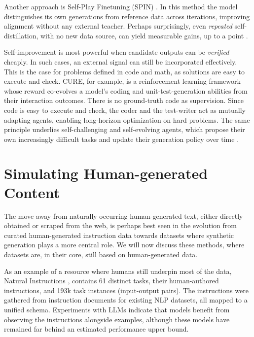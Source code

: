 Another approach is Self-Play Finetuning (SPIN) \citep{chen2024self}. In this method  the model distinguishes its own generations from reference data across iterations, improving alignment without any external teacher. Perhaps surprisingly, even \emph{repeated} self-distillation, with no new data source, can yield measurable gains, up to a point \citep{pareek2024understandinggainsrepeatedselfdistillation}.

Self-improvement is most powerful when candidate outputs can be \emph{verified} cheaply. In such cases, an external signal can still be incorporated effectively. This is the case for problems defined in code and math, as solutions are easy to execute and check. CURE, for example, is a reinforcement learning framework whose reward co-evolves a model's coding and unit-test-generation abilities from their interaction outcomes. There is no ground-truth code as supervision. Since code is easy to execute and check, the coder and the test-writer act as mutually adapting agents, enabling long-horizon optimization on hard problems. The same principle underlies self-challenging and self-evolving agents, which propose their own increasingly difficult tasks and update their generation policy over time \citep{NEURIPS2025_a5a305fa, huang2025r, NEURIPS2025_d38653cd}.




\section{Simulating Human-generated Content}
\label{sec:sim-hum}
The  move away from naturally occurring human-generated text, either directly obtained or scraped from the web, is perhaps best seen in the evolution from curated human-generated instruction data towards datasets where synthetic generation plays a more central role. We will now discuss these methods, where datasets are, in their core, still based on human-generated data.

As an example of a resource where humans still underpin most of the data, Natural Instructions \citep{mishra-etal-2022-cross}, contains 61 distinct tasks, their human-authored instructions, and 193k task instances (input-output pairs). The instructions were gathered from instruction documents for existing NLP datasets, all mapped to a unified schema. Experiments with LLMs indicate that models benefit from observing the instructions alongside examples, although these models have remained far behind an estimated performance upper bound.

